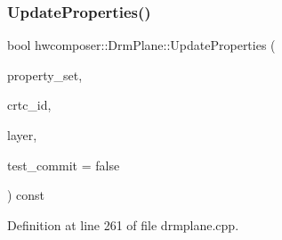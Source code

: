 \subsubsection{\texorpdfstring{Update\+Properties()}{UpdateProperties()}}
{\footnotesize\ttfamily bool hwcomposer\+::\+Drm\+Plane\+::\+Update\+Properties (\begin{DoxyParamCaption}\item[{drm\+Mode\+Atomic\+Req\+Ptr}]{property\+\_\+set,  }\item[{uint32\+\_\+t}]{crtc\+\_\+id,  }\item[{const \mbox{\hyperlink{structhwcomposer_1_1OverlayLayer}{Overlay\+Layer}} $\ast$}]{layer,  }\item[{bool}]{test\+\_\+commit = {\ttfamily false} }\end{DoxyParamCaption}) const}



Definition at line 261 of file drmplane.\+cpp.


